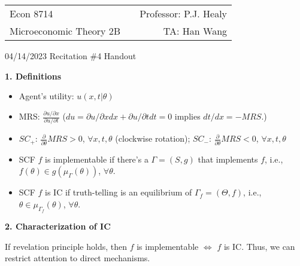 \documentclass[11pt,leqno]{article}
\begin{document}
\vspace*{-20mm}

\begin{tabular*}{\textwidth}{@{\extracolsep{\fill}}lcr}
Econ 8714     & \hfill    &         Professor: P.J. Healy          \\
Microeconomic Theory 2B  &           &   TA: Han Wang    
\end{tabular*}

\bigskip
\begin{center}
{\Large 04/14/2023 Recitation \#4 Handout}
\end{center}

\bigskip


\textbf{1. Definitions}
\begin{itemize}
    \item Agent's utility: $u(x,t|\theta)$
    \item MRS: $\frac{\partial u/\partial x}{\partial u/\partial t}$ ($du=\partial u/\partial x d x +\partial u/\partial t d t=0$ implies $dt/dx =-MRS$.) 
    \item $SC_{+}$: $\frac{\partial}{\partial \theta}MRS> 0$, $\forall x,t, \theta$ (clockwise rotation); $SC_{-}$: $\frac{\partial}{\partial \theta}MRS< 0$, $\forall x,t, \theta$
    \item SCF $f$ is implementable if there's a $\Gamma=(S,g)$ that implements $f$, i.e., $f(\theta) \in g(\mu_{\Gamma}(\theta))$, $\forall \theta$.
    \item SCF $f$ is IC if truth-telling is an equilibrium of $\Gamma_{f}=(\Theta,f)$, i.e., $\theta \in \mu_{\Gamma_{f}}(\theta)$, $\forall \theta$.
\end{itemize}


\textbf{2. Characterization of IC}

If revelation principle holds, then $f$ is implementable $\iff$ $f$ is IC. Thus, we can restrict attention to direct mechanisms.
\end{document}
